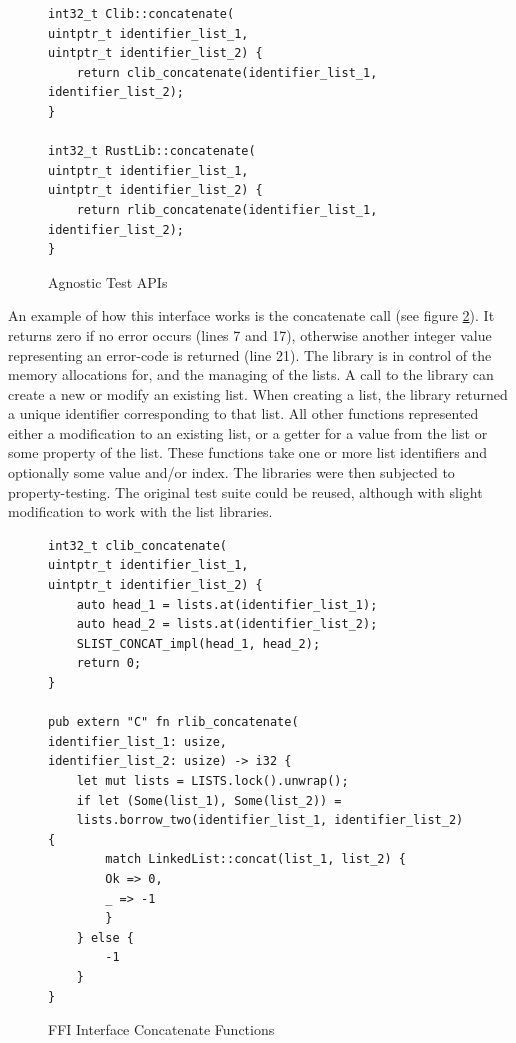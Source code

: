 \begin{figure}[H]
 \vspace{12pt}
\begin{lstlisting}[style=CSTYLE]
int32_t Clib::concatenate(
uintptr_t identifier_list_1, 
uintptr_t identifier_list_2) {
    return clib_concatenate(identifier_list_1, identifier_list_2);
}

int32_t RustLib::concatenate(
uintptr_t identifier_list_1, 
uintptr_t identifier_list_2) {
    return rlib_concatenate(identifier_list_1, identifier_list_2);
}
\end{lstlisting}
    \caption{Agnostic Test APIs}
    \label{fig:agnosticapi}
\end{figure}

An example of how this interface works is the concatenate call (see figure \ref{fig:agnostichelper}). It returns zero if no error occurs (lines 7 and 17), otherwise another integer value representing an error-code is returned (line 21). The library is in control of the memory allocations for, and the managing of the lists. A call to the library can create a new or modify an existing list. When creating a list, the library returned a unique identifier corresponding to that list. All other functions represented either a modification to an existing list, or a getter for a value from the list or some property of the list. These functions take one or more list identifiers and optionally some value and/or index. The libraries were then subjected to property-testing. The original test suite could be reused, although with slight modification to work with the list libraries. 

\begin{figure}[H]
 \vspace{12pt}
\begin{lstlisting}[style=CSTYLE]
int32_t clib_concatenate(
uintptr_t identifier_list_1, 
uintptr_t identifier_list_2) {
    auto head_1 = lists.at(identifier_list_1);
    auto head_2 = lists.at(identifier_list_2);
    SLIST_CONCAT_impl(head_1, head_2);
    return 0;
}

pub extern "C" fn rlib_concatenate(
identifier_list_1: usize, 
identifier_list_2: usize) -> i32 {
    let mut lists = LISTS.lock().unwrap();
    if let (Some(list_1), Some(list_2)) = 
    lists.borrow_two(identifier_list_1, identifier_list_2) {
        match LinkedList::concat(list_1, list_2) {
        Ok => 0,
        _ => -1
        }
    } else {
        -1
    }
}
\end{lstlisting}
    \caption{FFI Interface Concatenate Functions}
    \label{fig:agnostichelper}
\end{figure}